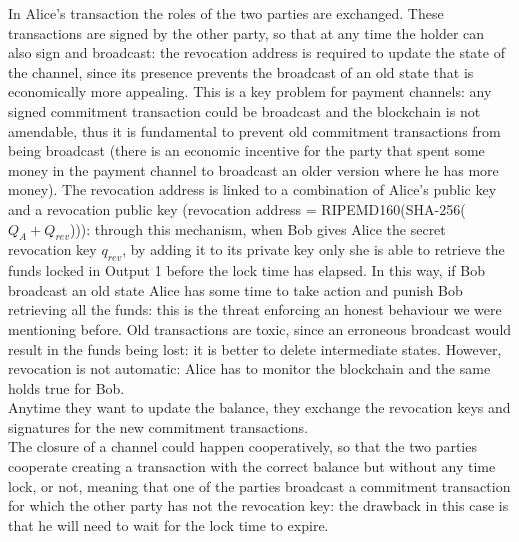 In Alice's transaction the roles of the two parties are exchanged. These transactions are signed by the other party, so that at any time the holder can also sign and broadcast: the revocation address is required to update the state of the channel, since its presence prevents the broadcast of an old state that is economically more appealing. This is a key problem for payment channels: any signed commitment transaction could be broadcast and the blockchain is not amendable, thus it is fundamental to prevent old commitment transactions from being broadcast (there is an economic incentive for the party that spent some money in the payment channel to broadcast an older version where he has more money). The revocation address is linked to a combination of Alice's public key and a revocation public key (revocation address = RIPEMD160(SHA-256($Q_A + Q_{rev}$))): through this mechanism, when Bob gives Alice the secret revocation key $q_{rev}$, by adding it to its private key only she is able to retrieve the funds locked in Output 1 before the lock time has elapsed. In this way, if Bob broadcast an old state Alice has some time to take action and punish Bob retrieving all the funds: this is the threat enforcing an honest behaviour we were mentioning before. Old transactions are toxic, since an erroneous broadcast would result in the funds being lost: it is better to delete intermediate states. However, revocation is not automatic: Alice has to monitor the blockchain and the same holds true for Bob.
\\
Anytime they want to update the balance, they exchange the revocation keys and signatures for the new commitment transactions.
\\
The closure of a channel could happen cooperatively, so that the two parties cooperate creating a transaction with the correct balance but without any time lock, or not, meaning that one of the parties broadcast a commitment transaction for which the other party has not the revocation key: the drawback in this case is that he will need to wait for the lock time to expire.  

